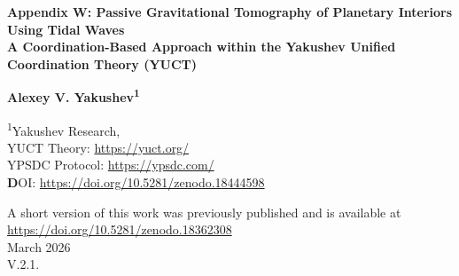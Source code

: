 \documentclass[12pt,a4paper]{article}
\theoremstyle{remark}
\begin{document}
	
	\begin{titlepage}
		\begin{center}
			\vspace*{1cm}
			
			\Huge\textbf{Appendix W: Passive Gravitational Tomography of Planetary Interiors Using Tidal Waves} \\
			\vspace{0.5cm}
			\Large\textbf{A Coordination-Based Approach within the Yakushev Unified Coordination Theory (YUCT)}
			
			\vspace{1.5cm}
			
			\Large\textbf{Alexey V. Yakushev\textsuperscript{1}}
			
			\vspace{0.3cm}
			\large
			\textsuperscript{1}Yakushev Research, \\
			YUCT Theory: \url{https://yuct.org/}\\
			YPSDC Protocol: \url{https://ypsdc.com/}\\
			
			
			\vspace{2cm}
			\textbf DOI: \url{https://doi.org/10.5281/zenodo.18444598}\\
			
			\vspace{1cm}
			
			\vspace{0cm}
			\large 
			A short version of this work was previously published and is available at\\ \url{https://doi.org/10.5281/zenodo.18362308}\\
			\vspace{1cm}
			March 2026 \\ \large V.2.1.
			
			\vspace{2cm}
			

\end{center}
\end{titlepage}
\end{document}
